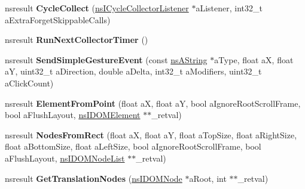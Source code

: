 \begin{DoxyCompactItemize}
\item 
\mbox{\label{interfacens_i_d_o_m_window_utils_a2a860d8036a7f5a7f278c1def103fc0d}} 
nsresult {\bfseries Cycle\+Collect} (\hyperlink{interfacens_i_supports}{ns\+I\+Cycle\+Collector\+Listener} $\ast$a\+Listener, int32\+\_\+t a\+Extra\+Forget\+Skippable\+Calls)
\item 
\mbox{\label{interfacens_i_d_o_m_window_utils_a82ab735f6920b4213ae2a766c3b937ab}} 
nsresult {\bfseries Run\+Next\+Collector\+Timer} ()
\item 
\mbox{\label{interfacens_i_d_o_m_window_utils_a9a079acc455000ca2f81663f7e31a0a5}} 
nsresult {\bfseries Send\+Simple\+Gesture\+Event} (const \hyperlink{structns_string_container}{ns\+A\+String} $\ast$a\+Type, float aX, float aY, uint32\+\_\+t a\+Direction, double a\+Delta, int32\+\_\+t a\+Modifiers, uint32\+\_\+t a\+Click\+Count)
\item 
\mbox{\label{interfacens_i_d_o_m_window_utils_acfcc43718efd6b67096fbb607e3b5f36}} 
nsresult {\bfseries Element\+From\+Point} (float aX, float aY, bool a\+Ignore\+Root\+Scroll\+Frame, bool a\+Flush\+Layout, \hyperlink{interfacens_i_d_o_m_element}{ns\+I\+D\+O\+M\+Element} $\ast$$\ast$\+\_\+retval)
\item 
\mbox{\label{interfacens_i_d_o_m_window_utils_a4910252beebfe82001af7eb3c337b0ec}} 
nsresult {\bfseries Nodes\+From\+Rect} (float aX, float aY, float a\+Top\+Size, float a\+Right\+Size, float a\+Bottom\+Size, float a\+Left\+Size, bool a\+Ignore\+Root\+Scroll\+Frame, bool a\+Flush\+Layout, \hyperlink{interfacens_i_d_o_m_node_list}{ns\+I\+D\+O\+M\+Node\+List} $\ast$$\ast$\+\_\+retval)
\item 
\mbox{\label{interfacens_i_d_o_m_window_utils_ab79fe7501451d2e96ebdd694206bdb0a}} 
nsresult {\bfseries Get\+Translation\+Nodes} (\hyperlink{interfacens_i_d_o_m_node}{ns\+I\+D\+O\+M\+Node} $\ast$a\+Root, int $\ast$$\ast$\+\_\+retval)
\item 
\mbox{\label{interfacens_i_d_o_m_window_utils_a755a5fe16a58ec048e521e930b737bd6}} 
$$
\end{DoxyCompactItemize}

